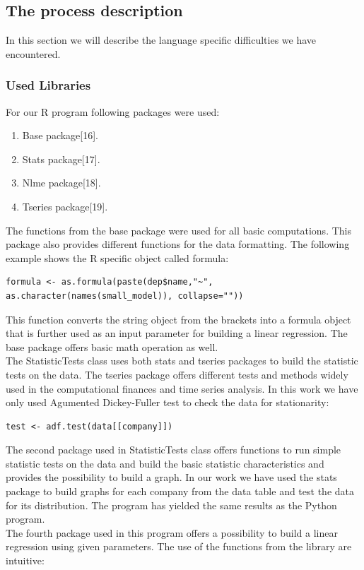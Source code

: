 \documentclass[
  twoside,
  12pt, a4paper,
  footinclude=true,
  headinclude=true,
  cleardoublepage=empty
]{article}
\begin{document}
\subsection{The process description}
In this section we will describe the language specific difficulties we have encountered.
\subsubsection{Used Libraries}
For our R program following packages were used:
\begin{enumerate}
    \item Base package[16].
    \item Stats package[17].
    \item Nlme package[18].
    \item Tseries package[19].
\end{enumerate}
The functions from the base package were used for all basic computations. This package also provides different functions for the data formatting. The following example shows the R specific object called formula:
\begin{verbatim}
formula <- as.formula(paste(dep$name,"~", as.character(names(small_model)), collapse=""))
\end{verbatim}
This function converts the string object from the brackets into a formula object that is further used as an input parameter for building a linear regression. The base package offers basic math operation as well.\\
The StatisticTests class uses both stats and tseries packages to build the statistic tests on the data. The tseries package offers different tests and methods widely used in the computational finances and time series analysis. In this work we have only used Agumented Dickey-Fuller test to check the data for stationarity:
\begin{verbatim}
test <- adf.test(data[[company]])
\end{verbatim}
The second package used in StatisticTests class offers functions to run simple statistic tests on the data and build the basic statistic characteristics and provides the possibility to build a graph. In our work we have used the stats package to build graphs for each company from the data table and test the data for its distribution. The program has yielded the same results as the Python program.\\
The fourth package used in this program offers a possibility to build a linear regression using given parameters. The use of the functions from the library are intuitive:
\end{document}

